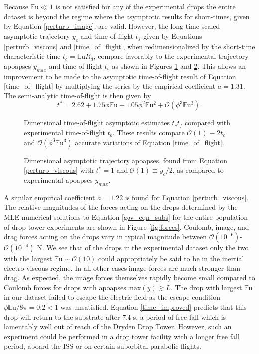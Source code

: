 \documentclass[aip,reprint, floatfix]{revtex4-1}
\begin{document}
Because $\mathbb{E}\mbox{u} \ll 1$ is not satisfied for any of the experimental drops the entire dataset is beyond the regime where the asymptotic results for short-times, given by Equation \ref{perturb_image}, are valid. However, the long-time scaled asymptotic trajectory   $y_c$ and time-of-flight $t_f$ given by Equations \ref{perturb_viscous} and \ref{time_of_flight}, when redimensionalized by the short-time characteristic time $t_c=\mathbb{E}\mbox{u} R_d$, compare favorably to the experimental trajectory apoapses $y_{max}$ and time-of-flight $t_b$ as shown in Figures \ref{fig:times2} and \ref{fig:ymaxes}. This allows an improvement to be made to the asymptotic time-of-flight result of Equation \ref{time_of_flight} by multiplying the series by the empirical coefficient $a = 1.31$. The semi-analytic time-of-flight is then given by
\begin{equation}
\label{time_improved}
t^* = 2.62 + 1.75\phi\mathbb{E}\mbox{u} + 1.05\phi^2\mathbb{E}\mbox{u}^{2} + \mathcal{O}(\phi^3\mathbb{E}\mbox{u}^{3}).
\end{equation}
\begin{figure}[htb]
    \centering
    \resizebox{0.5\textwidth}{!}{}
    \caption{Dimensional time-of-flight asymptotic estimates $t_c t_f$ compared with experimental time-of-flight $t_b$. These results compare $\mathcal{O}(1) \equiv 2 t_c$ and $\mathcal{O}(\phi^3\mathbb{E}\mbox{u}^{3})$ accurate variations of Equation \ref{time_of_flight}. \label{fig:times2}}
\end{figure}
\begin{figure}[htb]
    \centering
    \resizebox{0.5\textwidth}{!}{}
    \caption{Dimensional asymptotic trajectory apoapses, found from Equation \ref{perturb_viscous} with $t^*=1$ and $\mathcal{O}(1) \equiv y_c/2$, as compared to experimental apoapses $y_{max}$. \label{fig:ymaxes}}
\end{figure}
A similar empirical coefficient $a = 1.22$ is found for Equation \ref{perturb_viscous}. 
The relative magnitudes of the forces acting on the drops determined by the MLE numerical solutions to Equation \ref{gov_eqn_subs} for the entire population of drop tower experiments are shown in Figure \ref{fig:forces}. Coulomb, image, and drag forces acting on the drops vary in typical magnitude between $\mathcal{O}(10^{-6})$-$\mathcal{O}(10^{-4})$ N. We see that of the drops in the experimental dataset only the two with the largest $\mathbb{E}\mbox{u} \sim \mathcal{O}(10)$ could appropriately be said to be in the inertial electro-viscous regime. In all other cases image forces are much stronger than drag. As expected, the image forces themselves rapidly become small compared to Coulomb forces for drops with apoapses $\mbox{max}\left( y\right) \gtrsim L$. The drop with largest $\mathbb{E}\mbox{u}$ in our dataset failed to escape the electric field as the escape condition $\phi \mathbb{E}\mbox{u} / 8\pi = 0.2 < 1$ was unsatisfied. Equation \ref{time_improved} predicts that this drop will return to the substrate after 7.4 s, a period of free-fall which is lamentably well out of reach of the Dryden Drop Tower. However, such an experiment could be performed in a drop tower facility with a longer free fall period, aboard the ISS or on certain suborbital parabolic flights.
\end{document}
